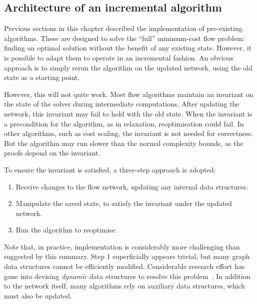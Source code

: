 \subsection{Architecture of an incremental algorithm} \label{sec:impl-incremental-architecture}

Previous sections in this chapter described the implementation of pre-existing algorithms. These are designed to solve the ``full'' minimum-cost flow problem: finding an optimal solution without the benefit of any existing state. However, it is possible to adapt them to operate in an incremental fashion. An obvious approach is to simply rerun the algorithm on the updated network, using the old state as a starting point.

However, this will not quite work. Most flow algorithms maintain an invariant on the state of the solver during intermediate computations. After updating the network, this invariant may fail to hold with the old state. When the invariant is a precondition for the algorithm, as in relaxation, reoptimisation could fail. In other algorithms, such as cost scaling, the invariant is not needed for correctness. But the algorithm may run slower than the normal complexity bounds, as the proofs depend on the invariant. 

To ensure the invariant is satisfied, a three-step approach is adopted:

\begin{enumerate}
    \item Receive changes to the flow network, updating any internal data structures.
    \item Manipulate the saved state, to satisfy the invariant under the updated network.
    \item Run the algorithm to reoptimise.
\end{enumerate}

Note that, in practice, implementation is considerably more challenging than suggested by this summary. Step 1 superficially appears trivial, but many graph data structures cannot be efficiently modified. Considerable research effort has gone into devising \emph{dynamic} data structures to resolve this problem~\cite{Tarjan:1983,Eppstein:1996}. In addition to the network itself, many algorithms rely on auxiliary data structures\footnotemark, which must also be updated.

